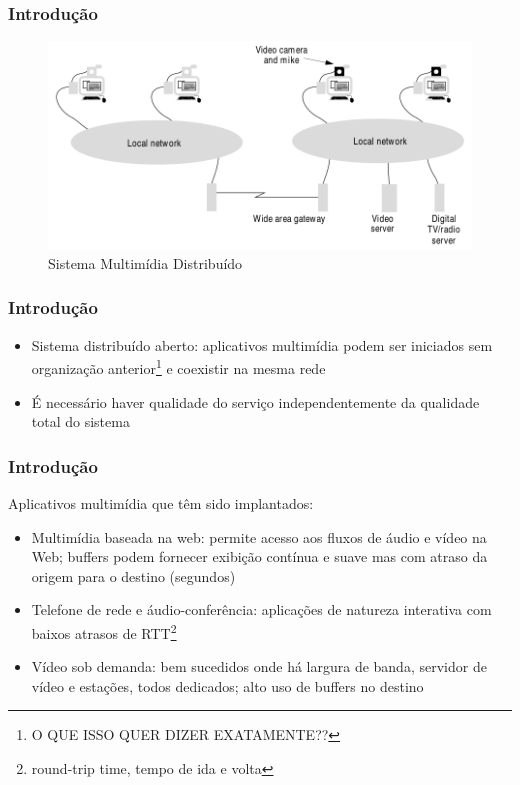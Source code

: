 \documentclass[]{beamer}
\begin{document}
\begin{frame}
  \frametitle{Introdução}
   \begin{figure}[hbtp]
  \caption{Sistema Multimídia Distribuído}
  \begin{center}
   \includegraphics[scale=0.28]{sistema_multimidia_distribuido.png}
  \end{center}
 \end{figure}
\end{frame}

\begin{frame}
  \frametitle{Introdução}
\begin{itemize}
  \item Sistema distribuído aberto: aplicativos multimídia podem ser iniciados sem organização
anterior\footnote{O QUE ISSO QUER DIZER EXATAMENTE??} e coexistir na mesma rede
  \item É necessário haver qualidade do serviço independentemente da qualidade total do sistema
\end{itemize}
\end{frame}

\begin{frame}
  \frametitle{Introdução}
Aplicativos multimídia que têm sido implantados:
\begin{itemize}
  \item Multimídia baseada na web: permite acesso aos fluxos de áudio e vídeo na Web; buffers
podem fornecer exibição contínua e suave mas com atraso da origem para o destino (segundos)
  \item Telefone de rede e áudio-conferência: aplicações de natureza interativa com baixos
atrasos de RTT\footnote{round-trip time, tempo de ida e volta}
  \item Vídeo sob demanda: bem sucedidos onde há largura de banda, servidor de vídeo e 
estações, todos dedicados;
alto uso de buffers no destino
\end{itemize}
\end{frame}
\end{document}
